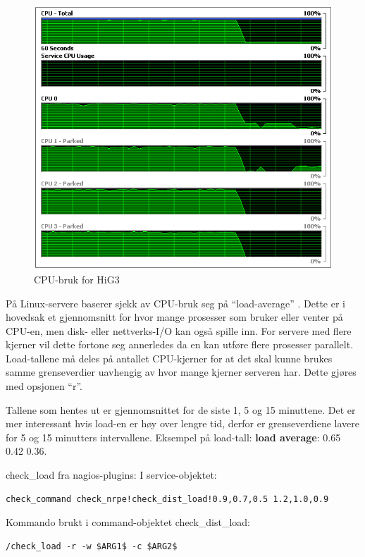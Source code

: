 \begin{figure}[H]
    \centering
    \includegraphics[scale=0.6]{img/HiG3_cpu_graph}
    \caption{CPU-bruk for HiG3}
    \label{cpustrain}
\end{figure}

På Linux-servere baserer sjekk av CPU-bruk seg på ``load-average'' \cite{loadavg, wiki:loadavg}. Dette er i hovedsak et gjennomsnitt for hvor mange prosesser som bruker eller venter på CPU-en, men disk- eller nettverks-I/O kan også spille inn. For servere med flere kjerner vil dette fortone seg annerledes da en kan utføre flere prosesser parallelt. Load-tallene må deles på antallet CPU-kjerner for at det skal kunne brukes samme grenseverdier uavhengig av hvor mange kjerner serveren har. Dette gjøres med opsjonen ``r''.

Tallene som hentes ut er gjennomsnittet for de siste 1, 5 og 15 minuttene. Det er mer interessant hvis load-en er høy over lengre tid, derfor er grenseverdiene lavere for 5 og 15 minutters intervallene. Eksempel på load-tall: {\bf load average}: 0.65 0.42 0.36.

check\_load fra nagios-plugins:
I service-objektet:
\begin{lstlisting}[style=example]
check_command check_nrpe!check_dist_load!0.9,0.7,0.5 1.2,1.0,0.9
\end{lstlisting}
Kommando brukt i command-objektet check\_dist\_load:
\begin{lstlisting}[style=example]
/check_load -r -w $ARG1$ -c $ARG2$
\end{lstlisting}

